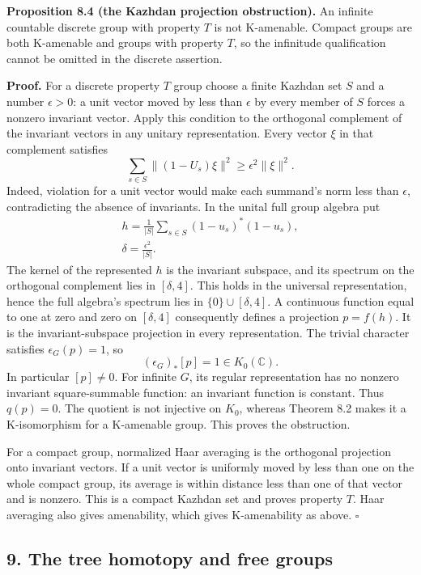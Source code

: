 \documentclass[
  11pt,
]{article}
\begin{document}
\textbf{Proposition 8.4 (the Kazhdan projection obstruction).} An
infinite countable discrete group with property \(T\) is not K-amenable.
Compact groups are both K-amenable and groups with property \(T\), so
the infinitude qualification cannot be omitted in the discrete
assertion.

\textbf{Proof.} For a discrete property \(T\) group choose a finite
Kazhdan set \(S\) and a number \(\epsilon>0\): a unit vector moved by
less than \(\epsilon\) by every member of \(S\) forces a nonzero
invariant vector. Apply this condition to the orthogonal complement of
the invariant vectors in any unitary representation. Every vector
\(\xi\) in that complement satisfies \[
\sum_{s\in S}\|(1-U_s)\xi\|^2
 \geq\epsilon^2\|\xi\|^2.
\tag{8.10}
\] Indeed, violation for a unit vector would make each summand's norm
less than \(\epsilon\), contradicting the absence of invariants. In the
unital full group algebra put \[
\begin{gathered}
h=\frac1{|S|}\sum_{s\in S}(1-u_s)^*(1-u_s),\\
\delta=\frac{\epsilon^2}{|S|}.
\end{gathered}
\tag{8.11}
\] The kernel of the represented \(h\) is the invariant subspace, and
its spectrum on the orthogonal complement lies in \([\delta,4]\). This
holds in the universal representation, hence the full algebra's spectrum
lies in \(\{0\}\cup[\delta,4]\). A continuous function equal to one at
zero and zero on \([\delta,4]\) consequently defines a projection
\(p=f(h)\). It is the invariant-subspace projection in every
representation. The trivial character satisfies \(\epsilon_G(p)=1\), so
\[
(\epsilon_G)_*[p]=1\in K_0(\mathbb C).
\tag{8.12}
\] In particular \([p]\ne0\). For infinite \(G\), its regular
representation has no nonzero invariant square-summable function: an
invariant function is constant. Thus \(q(p)=0\). The quotient is not
injective on \(K_0\), whereas Theorem 8.2 makes it a K-isomorphism for a
K-amenable group. This proves the obstruction.

For a compact group, normalized Haar averaging is the orthogonal
projection onto invariant vectors. If a unit vector is uniformly moved
by less than one on the whole compact group, its average is within
distance less than one of that vector and is nonzero. This is a compact
Kazhdan set and proves property \(T\). Haar averaging also gives
amenability, which gives K-amenability as above. \(\square\)

\subsection{9. The tree homotopy and free
groups}\label{the-tree-homotopy-and-free-groups}
\end{document}
